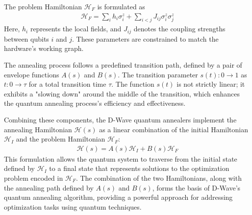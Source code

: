 The problem Hamiltonian $\mathcal{H}_F$ is formulated as
\begin{align}
    \mathcal{H}_F=\sum_i h_i \sigma_i^z + \sum_{i<j}J_{ij} \sigma_i^z \sigma_j^z
\end{align}
Here, $h_i$ represents the local fields, and $J_{ij}$ denotes the coupling strengths between qubits $i$ and $j$. These parameters are constrained to match the hardware's working graph.

The annealing process follows a predefined transition path, defined by a pair of envelope functions $A(s)$ and $B(s)$. The transition parameter $s(t): 0 \longrightarrow 1$ as $t: 0\longrightarrow \tau$ for a total transition time $\tau$. The function $s(t)$ is not strictly linear; it exhibits a "slowing down" around the middle of the transition, which enhances the quantum annealing process's efficiency and effectiveness.

Combining these components, the D-Wave quantum annealers implement the annealing Hamiltonian $\mathcal{H}(s)$ as a linear combination of the initial Hamiltonian $\mathcal{H}_I$ and the problem Hamiltonian $\mathcal{H}_F$:
\begin{align}
    \mathcal{H}(s)=A(s)\mathcal{H}_I+B(s)\mathcal{H}_F
\end{align}
This formulation allows the quantum system to traverse from the initial state defined by $\mathcal{H}_I$ to a final state that represents solutions to the optimization problem encoded in $\mathcal{H}_F$. The combination of the two Hamiltonians, along with the annealing path defined by $A(s)$ and $B(s)$, forms the basis of D-Wave's quantum annealing algorithm, providing a powerful approach for addressing optimization tasks using quantum techniques.